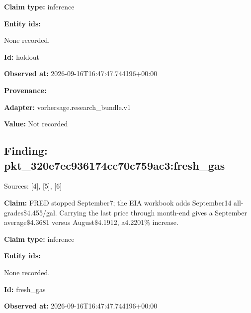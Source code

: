 \documentclass[11pt]{article}
\begin{document}
\par\noindent\textbf{Claim type:} inference

\par\noindent\textbf{Entity ids:} \par None recorded.

\par\noindent\textbf{Id:} holdout

\par\noindent\textbf{Observed at:} 2026-09-16T1\hspace{0pt}6:47:47.7441\hspace{0pt}96+00:00

\par\noindent\textbf{Provenance:} \par \par\noindent\textbf{Adapter:} vorhersage.r\hspace{0pt}esearch\_bund\hspace{0pt}le.v1

\par\noindent\textbf{Value:} Not recorded

\subsection*{\textcolor{epdarkgreen}{Finding: pkt\_320e7ec9\hspace{0pt}36174cc70c75\hspace{0pt}9ac3:fresh\_g\hspace{0pt}as}}
Sources: [4], [5], [6]


\par\noindent\textbf{Claim:} FRED stopped September7; the EIA workbook adds September14 all-grades\$4.455/gal. Carrying the last price through month-end gives a September average\$4.3681 versus August\$4.1912, a4.2201\% increase.

\par\noindent\textbf{Claim type:} inference

\par\noindent\textbf{Entity ids:} \par None recorded.

\par\noindent\textbf{Id:} fresh\_gas

\par\noindent\textbf{Observed at:} 2026-09-16T1\hspace{0pt}6:47:47.7441\hspace{0pt}96+00:00
\end{document}
